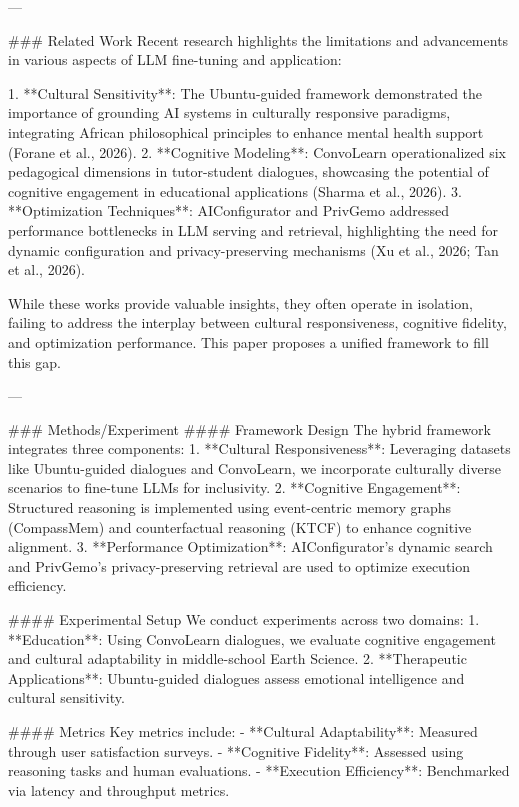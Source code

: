 ---

### Related Work
Recent research highlights the limitations and advancements in various aspects of LLM fine-tuning and application:

1. **Cultural Sensitivity**: The Ubuntu-guided framework demonstrated the importance of grounding AI systems in culturally responsive paradigms, integrating African philosophical principles to enhance mental health support (Forane et al., 2026).
2. **Cognitive Modeling**: ConvoLearn operationalized six pedagogical dimensions in tutor-student dialogues, showcasing the potential of cognitive engagement in educational applications (Sharma et al., 2026).
3. **Optimization Techniques**: AIConfigurator and PrivGemo addressed performance bottlenecks in LLM serving and retrieval, highlighting the need for dynamic configuration and privacy-preserving mechanisms (Xu et al., 2026; Tan et al., 2026).

While these works provide valuable insights, they often operate in isolation, failing to address the interplay between cultural responsiveness, cognitive fidelity, and optimization performance. This paper proposes a unified framework to fill this gap.

---

### Methods/Experiment
#### Framework Design
The hybrid framework integrates three components:
1. **Cultural Responsiveness**: Leveraging datasets like Ubuntu-guided dialogues and ConvoLearn, we incorporate culturally diverse scenarios to fine-tune LLMs for inclusivity.
2. **Cognitive Engagement**: Structured reasoning is implemented using event-centric memory graphs (CompassMem) and counterfactual reasoning (KTCF) to enhance cognitive alignment.
3. **Performance Optimization**: AIConfigurator's dynamic search and PrivGemo's privacy-preserving retrieval are used to optimize execution efficiency.

#### Experimental Setup
We conduct experiments across two domains:
1. **Education**: Using ConvoLearn dialogues, we evaluate cognitive engagement and cultural adaptability in middle-school Earth Science.
2. **Therapeutic Applications**: Ubuntu-guided dialogues assess emotional intelligence and cultural sensitivity.

#### Metrics
Key metrics include:
- **Cultural Adaptability**: Measured through user satisfaction surveys.
- **Cognitive Fidelity**: Assessed using reasoning tasks and human evaluations.
- **Execution Efficiency**: Benchmarked via latency and throughput metrics.

